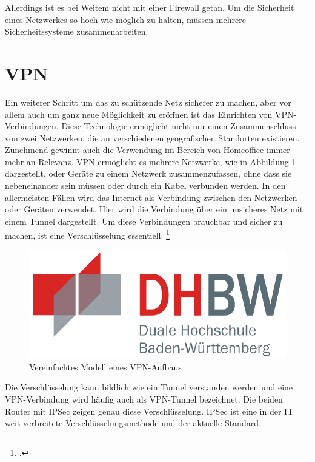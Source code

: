 Allerdings ist es bei Weitem nicht mit einer Firewall getan. Um die Sicherheit eines Netzwerkes so hoch wie möglich zu halten, müssen mehrere Sicherheitssysteme zusammenarbeiten.


\section{VPN} %
\label{sec:VPN}

Ein weiterer Schritt um das zu schützende Netz sicherer zu machen, aber vor allem auch um ganz neue Möglichkeit zu eröffnen ist das Einrichten von VPN-Verbindungen. Diese Technologie ermöglicht nicht nur einen Zusammenschluss von zwei Netzwerken, die an verschiedenen geografischen Standorten existieren. Zunehmend gewinnt auch die Verwendung im Bereich von Homeoffice immer mehr an Relevanz. VPN ermöglicht es mehrere Netzwerke, wie in Abbildung \ref{abb:VPN-Modell} dargestellt, oder Geräte zu einem Netzwerk zusammenzufassen, ohne dass sie nebeneinander sein müssen oder durch ein Kabel verbunden werden. In den allermeisten Fällen wird das Internet als Verbindung zwischen den Netzwerken oder Geräten verwendet. Hier wird die Verbindung über ein unsicheres Netz mit einem Tunnel dargestellt. Um diese Verbindungen brauchbar und sicher zu machen, ist eine Verschlüsselung essentiell. \footcite[Vgl.][S. 261 ff.]{WHITMAN.2018}

\begin{figure}[htb]
	\centering
	\includegraphics[width=12cm]{graphics/dhbw.png}
	\caption[Vereinfachtes Modell eines VPN-Aufbaus]{Vereinfachtes Modell eines VPN-Aufbaus \footnotemark}
	\label{abb:VPN-Modell}
\end{figure}

Die Verschlüsselung kann bildlich wie ein Tunnel verstanden werden und eine VPN-Verbindung wird häufig auch als VPN-Tunnel bezeichnet. Die beiden Router mit IPSec zeigen genau diese Verschlüsselung. IPSec ist eine in der IT weit verbreitete Verschlüsselungsmethode und der aktuelle Standard. \footnotemark
{}

